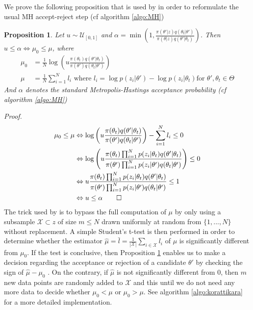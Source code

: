 \documentclass[11pt,a4paper]{report}\usepackage[]{graphicx}\usepackage[]{color}
\newtheorem{proposition}{Proposition}[section]
\begin{document}
\noindent We prove the following proposition that is used by \cite{korattikara2014austerity} in order to reformulate the usual MH accept-reject step (cf algorithm \ref{algo:MH})
\begin{proposition}
\label{eq:korattikara1.1}
Let $u\sim\mathcal{U}_{[0,1]}$ and $\alpha=\min\left(1,\frac{\pi(\theta'|z)q(\theta_t|\theta')}{\pi(\theta|z)q(\theta'|\theta_t)}\right)$. Then  $u\leq\alpha\Leftrightarrow\mu_0\leq\mu$, where
\begin{align}
\mu_0&=\frac1N\log\left(u\frac{\pi(\theta_t)q(\theta'|\theta_t)}{\pi(\theta')q(\theta_t|\theta')}\right)\\
\mu&=\frac1N\sum_{i=1}^Nl_i\text{ where }l_i=\log p(z_i|\theta')-\log p(z_i|\theta_t)\text{for $\theta', \theta_t \in \Theta$}
\end{align}
And $\alpha$ denotes the standard Metropolis-Hastings acceptance probability (cf algorithm \ref{algo:MH})
\end{proposition}
\noindent\textit{Proof.}
\begin{align*}
\mu_0\leq\mu&\Leftrightarrow 
\log\left(u\frac{\pi(\theta_t)q(\theta'|\theta_t)}{\pi(\theta')q(\theta_t|\theta')}\right)-\sum_{i=1}^Nl_i\leq 0\\
&\Leftrightarrow \log\left(u\frac{\pi(\theta_t)\prod_{i=1}^Np(z_i|\theta_t)q(\theta'|\theta_t)}{\pi(\theta')\prod_{i=1}^Np(z_i|\theta')q(\theta_t|\theta')}\right)\leq 0\\
&\Leftrightarrow u\frac{\pi(\theta_t)\prod_{i=1}^Np(z_i|\theta_t)q(\theta'|\theta_t)}{\pi(\theta')\prod_{i=1}^Np(z_i|\theta')q(\theta_t|\theta')}\leq 1\\
&\Leftrightarrow u\leq\alpha\qed
\end{align*}
The trick used by \cite{korattikara2014austerity} is to bypass the full computation of $\mu$ by only using a subsample $\mathcal X\subset z$ of size $m\leq N$ drawn uniformly at random from $\{1,...,N\}$ without replacement. A simple Student's t-test is then performed in order to determine whether the estimator $\hat\mu=\bar{l}=\frac{1}{|\mathcal{X}|}\sum_{i\in\mathcal{X}}l_i$ of $\mu$ is significantly different from  $\mu_0$. If the test is conclusive, then Proposition \ref{eq:korattikara1.1} enables us to make a decision regarding the acceptance or rejection of a candidate $\theta'$ by checking the sign of $\hat\mu-\mu_0$ . On the contrary, if $\hat\mu$ is not significantly different from $0$, then $m$ new data points are randomly added to $\mathcal X$ and this until we do not need any more data to decide whether $\mu_0<\mu$ or $\mu_0>\mu$. See algorithm \ref{algo:korattikara} for a more detailed implementation.
\end{document}

